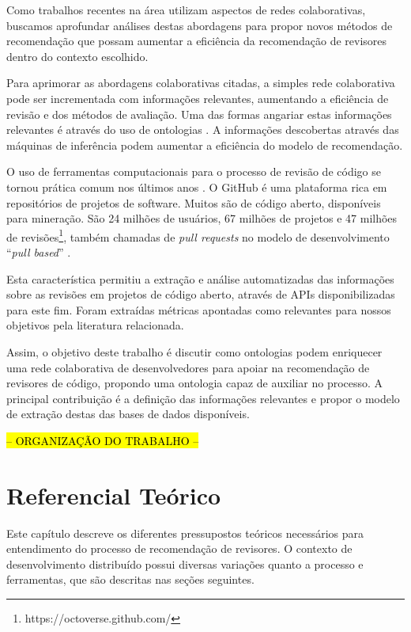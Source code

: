 \documentclass[a4paper,12pt]{monografia}
\theoremstyle{plain}
\theoremstyle{definition}
\theoremstyle{remark}
\begin{document}
Como trabalhos recentes na área utilizam aspectos de redes colaborativas, buscamos aprofundar análises destas abordagens para propor novos métodos de recomendação que possam aumentar a eficiência da recomendação de revisores dentro do contexto escolhido.

Para aprimorar as abordagens colaborativas citadas, a simples rede colaborativa pode ser incrementada com informações relevantes, aumentando a eficiência de revisão e dos métodos de avaliação. Uma das formas angariar estas informações relevantes é através do uso de ontologias \cite{middleton2001,middleton2004}. A informações descobertas através das máquinas de inferência podem aumentar a eficiência do modelo de recomendação.

O uso de ferramentas computacionais para o processo de revisão de código se tornou prática comum nos últimos anos \cite{Bacchelli2013}. O GitHub é uma plataforma rica em repositórios de projetos de software. Muitos são de código aberto, disponíveis para mineração. São 24 milhões de usuários, 67 milhões de projetos e 47 milhões de revisões\footnote{https://octoverse.github.com/}, também chamadas de \textit{pull requests} no modelo de desenvolvimento ``\textit{pull based}'' \cite{gousios2014}.

Esta característica permitiu a extração e análise automatizadas das informações sobre as revisões em projetos de código aberto, através de APIs disponibilizadas para este fim. Foram extraídas métricas apontadas como relevantes para nossos objetivos pela literatura relacionada.

Assim, o objetivo deste trabalho é discutir como ontologias podem enriquecer uma rede colaborativa de desenvolvedores para apoiar na recomendação de revisores de código, propondo uma ontologia capaz de auxiliar no processo. A principal contribuição é a definição das informações relevantes e propor o modelo de extração destas das bases de dados disponíveis.

\textcolor{red}{\hl{-- ORGANIZAÇÃO DO TRABALHO --}}

\chapter{Referencial Teórico}

Este capítulo descreve os diferentes pressupostos teóricos necessários para entendimento do processo de recomendação de revisores. O contexto de desenvolvimento distribuído possui diversas variações quanto a processo e ferramentas, que são descritas nas seções seguintes.
\end{document}

